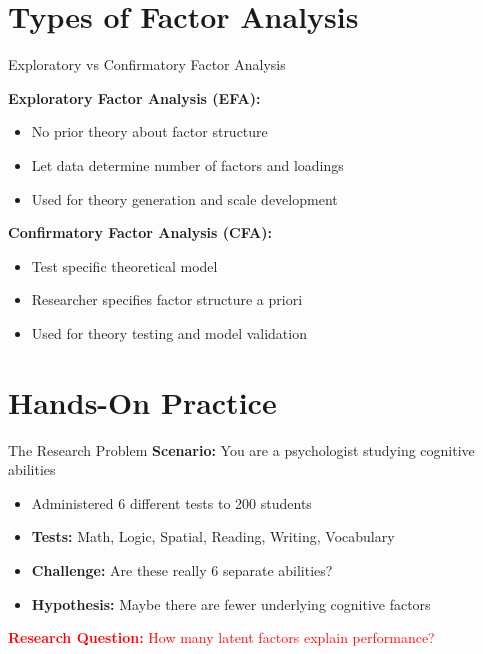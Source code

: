 \documentclass[aspectratio=169]{beamer}
\begin{document}
\section{Types of Factor Analysis}
\begin{frame}{Exploratory vs Confirmatory Factor Analysis}
  
  \textbf{Exploratory Factor Analysis (EFA):}
  \begin{itemize}
    \item No prior theory about factor structure
    \item Let data determine number of factors and loadings
    \item Used for theory generation and scale development
  \end{itemize}
  
  \textbf{Confirmatory Factor Analysis (CFA):}
  \begin{itemize}
    \item Test specific theoretical model
    \item Researcher specifies factor structure a priori
    \item Used for theory testing and model validation
  \end{itemize}
\end{frame}

\section{Hands-On Practice}

\begin{frame}{The Research Problem}
  \textbf{Scenario:} You are a psychologist studying cognitive abilities
  
  \begin{itemize}
    \item Administered 6 different tests to 200 students
    \pause
    \item \textbf{Tests:} Math, Logic, Spatial, Reading, Writing, Vocabulary
    \pause
    \item \textbf{Challenge:} Are these really 6 separate abilities?
    \pause
    \item \textbf{Hypothesis:} Maybe there are fewer underlying cognitive factors
  \end{itemize}
  
  \pause
  
  \begin{center}
    \textcolor{red}{\textbf{Research Question:} How many latent factors explain performance?}
  \end{center}
\end{frame}
\end{document}
